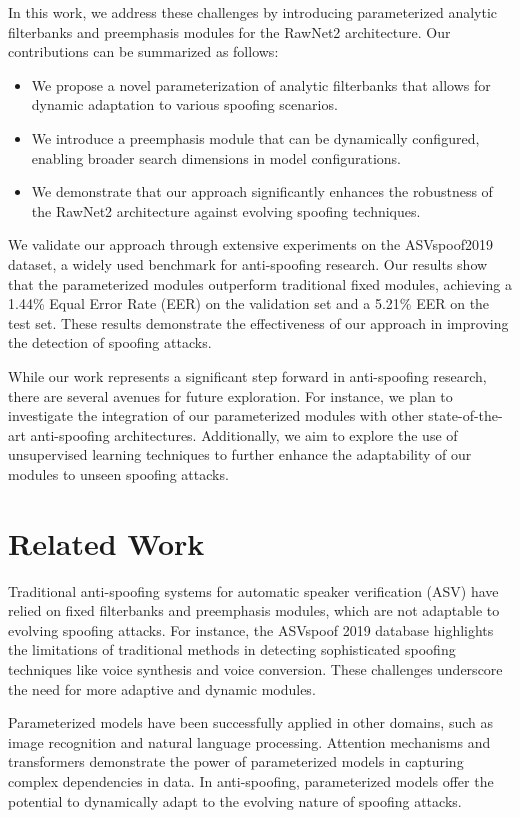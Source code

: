 \documentclass{article} %
\begin{document}
In this work, we address these challenges by introducing parameterized analytic filterbanks and preemphasis modules for the RawNet2 architecture. Our contributions can be summarized as follows:
\begin{itemize}
    \item We propose a novel parameterization of analytic filterbanks that allows for dynamic adaptation to various spoofing scenarios.
    \item We introduce a preemphasis module that can be dynamically configured, enabling broader search dimensions in model configurations.
    \item We demonstrate that our approach significantly enhances the robustness of the RawNet2 architecture against evolving spoofing techniques.
\end{itemize}

We validate our approach through extensive experiments on the ASVspoof2019 dataset, a widely used benchmark for anti-spoofing research. Our results show that the parameterized modules outperform traditional fixed modules, achieving a 1.44\% Equal Error Rate (EER) on the validation set and a 5.21\% EER on the test set. These results demonstrate the effectiveness of our approach in improving the detection of spoofing attacks.

While our work represents a significant step forward in anti-spoofing research, there are several avenues for future exploration. For instance, we plan to investigate the integration of our parameterized modules with other state-of-the-art anti-spoofing architectures. Additionally, we aim to explore the use of unsupervised learning techniques to further enhance the adaptability of our modules to unseen spoofing attacks.

\section{Related Work}
\label{sec:related}
Traditional anti-spoofing systems for automatic speaker verification (ASV) have relied on fixed filterbanks and preemphasis modules, which are not adaptable to evolving spoofing attacks. For instance, the ASVspoof 2019 database \citep{Wang2019TheA2} highlights the limitations of traditional methods in detecting sophisticated spoofing techniques like voice synthesis and voice conversion. These challenges underscore the need for more adaptive and dynamic modules.

Parameterized models have been successfully applied in other domains, such as image recognition and natural language processing. Attention mechanisms \citep{vaswani2017attention} and transformers \citep{dosovitskiy2020image} demonstrate the power of parameterized models in capturing complex dependencies in data. In anti-spoofing, parameterized models offer the potential to dynamically adapt to the evolving nature of spoofing attacks.
\end{document}
